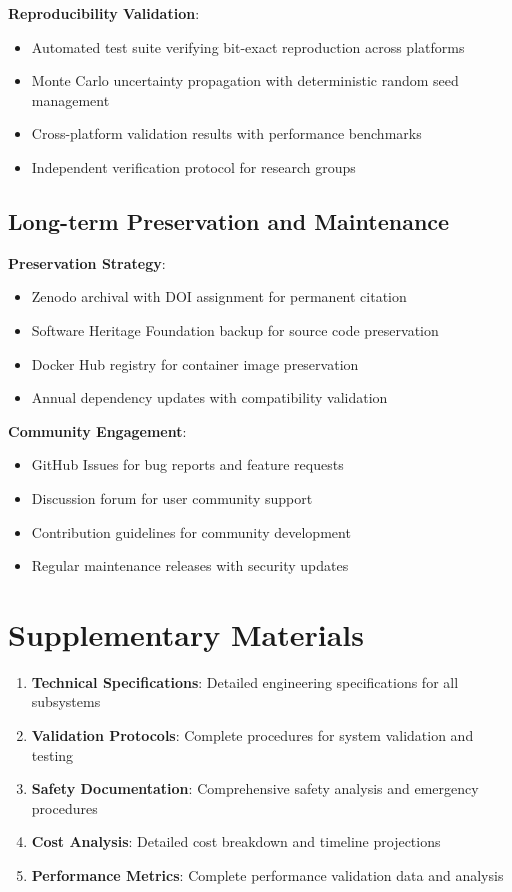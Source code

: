 \documentclass[12pt,a4paper]{article}
\begin{document}
\textbf{Reproducibility Validation}:
\begin{itemize}
\item Automated test suite verifying bit-exact reproduction across platforms
\item Monte Carlo uncertainty propagation with deterministic random seed management
\item Cross-platform validation results with performance benchmarks
\item Independent verification protocol for research groups
\end{itemize}

\subsection{Long-term Preservation and Maintenance}

\textbf{Preservation Strategy}:
\begin{itemize}
\item Zenodo archival with DOI assignment for permanent citation
\item Software Heritage Foundation backup for source code preservation
\item Docker Hub registry for container image preservation
\item Annual dependency updates with compatibility validation
\end{itemize}

\textbf{Community Engagement}:
\begin{itemize}
\item GitHub Issues for bug reports and feature requests
\item Discussion forum for user community support
\item Contribution guidelines for community development
\item Regular maintenance releases with security updates
\end{itemize}

\section{Supplementary Materials}

\begin{enumerate}
\item \textbf{Technical Specifications}: Detailed engineering specifications for all subsystems
\item \textbf{Validation Protocols}: Complete procedures for system validation and testing
\item \textbf{Safety Documentation}: Comprehensive safety analysis and emergency procedures
\item \textbf{Cost Analysis}: Detailed cost breakdown and timeline projections
\item \textbf{Performance Metrics}: Complete performance validation data and analysis
\end{enumerate}
\end{document}
